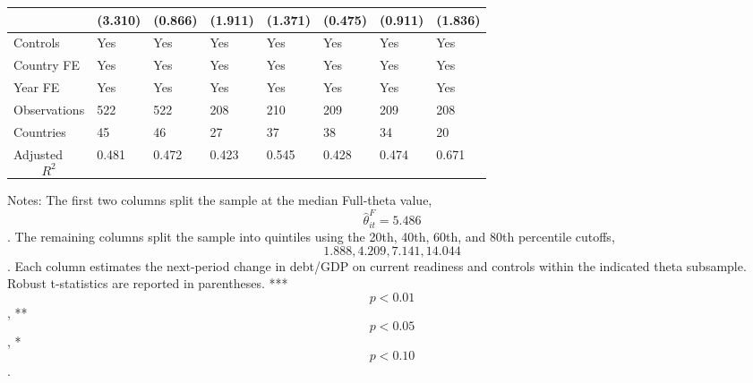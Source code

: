 \begin{table}[H]
\begin{threeparttable}
\begin{tabularx}{\textwidth}{lYYYYYYY}
  & (3.310) & (0.866) & (1.911) & (1.371) & (0.475) & (0.911) & (1.836) \\
\midrule
Controls & Yes & Yes & Yes & Yes & Yes & Yes & Yes \\
Country FE & Yes & Yes & Yes & Yes & Yes & Yes & Yes \\
Year FE & Yes & Yes & Yes & Yes & Yes & Yes & Yes \\
Observations & 522 & 522 & 208 & 210 & 209 & 209 & 208 \\
Countries & 45 & 46 & 27 & 37 & 38 & 34 & 20 \\
Adjusted $$R^2$$ & 0.481 & 0.472 & 0.423 & 0.545 & 0.428 & 0.474 & 0.671 \\
\bottomrule
\end{tabularx}
\begin{tablenotes}[flushleft]\footnotesize
\item Notes: The first two columns split the sample at the median Full-theta value, $$\widehat{\theta}^{F}_{it}=5.486$$. The remaining columns split the sample into quintiles using the 20th, 40th, 60th, and 80th percentile cutoffs, $$1.888, 4.209, 7.141, 14.044$$. Each column estimates the next-period change in debt/GDP on current readiness and controls within the indicated theta subsample. Robust t-statistics are reported in parentheses. *** $$p<0.01$$, ** $$p<0.05$$, * $$p<0.10$$.
\end{tablenotes}
\end{threeparttable}
\end{table}
